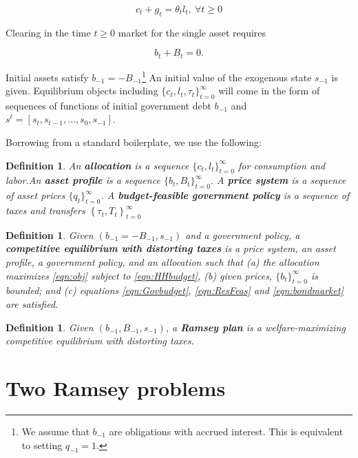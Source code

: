 \documentclass[12pt]{article}
\newtheorem{definition}[theorem]{Definition}
\begin{document}
\begin{equation}
 \label{eqn:ResFeas}
 c_{t}+g_t = \theta _{t} l_{t}, \ \forall t \geq 0
 \end{equation}

 Clearing in the time $t \geq 0$ market for the single asset requires


\begin{equation}
 \label{eqn:bondmarket}
 b_{t}+B_{t}=0.
 \end{equation}

 Initial assets satisfy $b_{-1}=-B_{-1}$\footnote{We assume that $b_{-1}$ are obligations with accrued interest. This is equivalent to setting $q_{-1}=1$.} An initial value of the exogenous state  $s_{-1}$ is given.
Equilibrium objects including $\{c_t, l_t, \tau_t\}_{t=0}^\infty$ will come in the form of sequences of functions of  initial government debt  $b_{-1}$ and  $s^t = [s_t, s_{t-1}, \ldots, s_0, s_{-1}]$.


Borrowing from a standard boilerplate, we use the following:

\begin{definition}
An \textbf{allocation} is a sequence $\{c_t,l_t\}_{t=0}^\infty$ for consumption and labor.An \textbf{asset profile}  is a sequence $\{b_t,B_t\}_{t=0}^\infty$. A \textbf{price system} is a sequence of asset prices $\{q_t\}_{t=0}^\infty$.  A \textbf{budget-feasible government policy} is a sequence of taxes and transfers $\left\{ \tau _{t},T_{t}\right\} _{t=0}^{\infty }$
\end{definition}

\begin{definition}
Given  $\left(b_{-1}=-B_{-1},s_{-1}\right) $ and a government policy,  a \textbf{competitive equilibrium
with distorting taxes} is a price system, an asset profile, a %
government policy, and an allocation such that (a)
the allocation maximizes \eqref{eqn:obj} subject to \eqref{eqn:HHbudget}, (b) given prices, $\{b_{t}\}_{t=0}^\infty$ is bounded; and  (c)
equations \eqref{eqn:Govbudget}, \eqref{eqn:ResFeas} and \eqref{eqn:bondmarket} are satisfied.
\end{definition}

\begin{definition}
Given $\left( b_{-1},B_{-1},s_{-1}\right) $, a \textbf{Ramsey plan} is a welfare-maximizing competitive
equilibrium with distorting taxes.
\end{definition}


\section{Two Ramsey problems}
\end{document}
